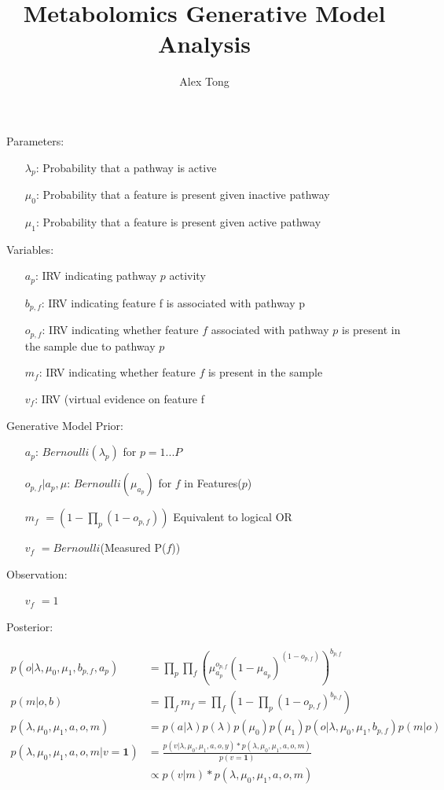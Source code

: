 \documentclass[11pt]{article}
\title{Metabolomics Generative Model Analysis}
\author{Alex Tong}
\begin{document}
\maketitle

Parameters:
\begin{itemize}
\item[$\lambda_p$:] Probability that a pathway is active
\item[$\mu_0$:] Probability that a feature is present given inactive pathway
\item[$\mu_1$:] Probability that a feature is present given active pathway
\end{itemize}

Variables:
\begin{itemize}
\item [$a_p$:] IRV indicating pathway $p$ activity
\item [$b_{p,f}$:] IRV indicating feature f is associated with pathway p
\item[$o_{p,f}$:] IRV indicating whether feature $f$ associated with pathway $p$ is present in the sample due to pathway $p$
\item[$m_f$:] IRV indicating whether feature $f$ is present in the sample
\item[$v_f$:] IRV (virtual evidence on feature f
\end{itemize}

Generative Model Prior:
\begin{itemize}
\item [$a_p$:] $Bernoulli(\lambda_p)$ for $p = 1 ... P$
\item [$o_{p,f} | a_p, \mu$:] $Bernoulli(\mu_{a_p})$ for $f$ in Features($p$)
\item [$m_f$]  $= (1 -  \prod_p (1 - o_{p,f}))$ Equivalent to logical OR
\item [$v_f$] $= Bernoulli$(Measured P($f$))
\end{itemize}

Observation:
\begin{itemize}
\item [$v_f$] $ = 1$
\end{itemize}

Posterior:

\begin{align}
p(o | \lambda, \mu_0, \mu_1, b_{p,f}, a_p) &= \prod_p \prod_{f} (\mu_{a_p}^{o_{p,f}} (1-\mu_{a_p})^{(1-o_{p,f})})^{b_{p,f}} \\
p(m | o, b) &= \prod_f m_f = \prod_f (1 - \prod_p (1 - o_{p,f})^{b_{p,f}}) \\
p(\lambda, \mu_0, \mu_1, a, o, m) &= p(a | \lambda )p(\lambda) p(\mu_0) p(\mu_1) p( o | \lambda, \mu_0, \mu_1, b_{p,f}) p(m | o) \\
p(\lambda, \mu_0, \mu_1, a, o, m | v = \mathbf{1}) &= \frac{p(v | \lambda, \mu_0, \mu_1, a, o, y) * p(\lambda, \mu_0, \mu_1, a, o, m)}{p(v = \mathbf{1})}  \\
&\propto p(v | m) * p(\lambda, \mu_0, \mu_1, a, o, m) 
\end{align}
\end{document}
